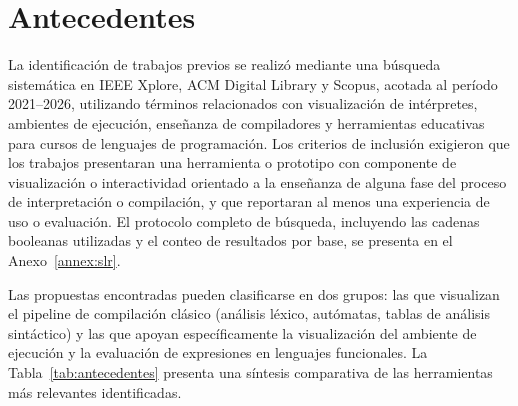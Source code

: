 \section{Antecedentes}
\label{sec:antecedentes}

La identificación de trabajos previos se realizó mediante una búsqueda sistemática en IEEE Xplore, ACM Digital Library y Scopus, acotada al período 2021--2026, utilizando términos relacionados con visualización de intérpretes, ambientes de ejecución, enseñanza de compiladores y herramientas educativas para cursos de lenguajes de programación. Los criterios de inclusión exigieron que los trabajos presentaran una herramienta o prototipo con componente de visualización o interactividad orientado a la enseñanza de alguna fase del proceso de interpretación o compilación, y que reportaran al menos una experiencia de uso o evaluación. El protocolo completo de búsqueda, incluyendo las cadenas booleanas utilizadas y el conteo de resultados por base, se presenta en el Anexo~\ref{annex:slr}.

Las propuestas encontradas pueden clasificarse en dos grupos: las que visualizan el pipeline de compilación clásico (análisis léxico, autómatas, tablas de análisis sintáctico) y las que apoyan específicamente la visualización del ambiente de ejecución y la evaluación de expresiones en lenguajes funcionales. La Tabla~\ref{tab:antecedentes} presenta una síntesis comparativa de las herramientas más relevantes identificadas.

